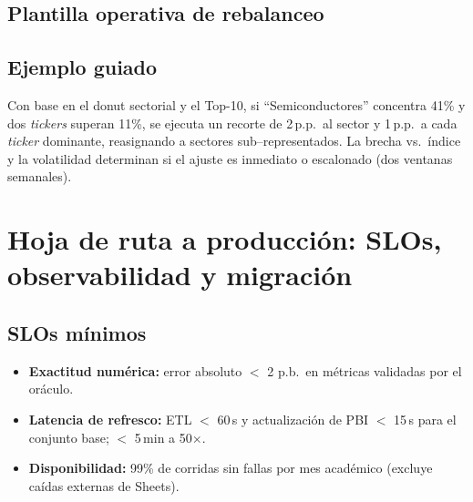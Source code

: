 \documentclass[conference]{IEEEtran}
\begin{document}
\subsection{Plantilla operativa de rebalanceo}
\begin{table}[!t]
\centering
\caption{Plantilla de política de rebalanceo (parametrizable)}
\label{tab:politica}
\vspace{-2mm}
\end{table}

\subsection{Ejemplo guiado}
Con base en el donut sectorial y el Top-10, si “Semiconductores” concentra 41\% y dos \emph{tickers} superan 11\%, se ejecuta un recorte de 2\,p.p.\ al sector y 1\,p.p.\ a cada \emph{ticker} dominante, reasignando a sectores sub–representados. La brecha vs.\ índice y la volatilidad determinan si el ajuste es inmediato o escalonado (dos ventanas semanales).

\section{Hoja de ruta a producción: SLOs, observabilidad y migración}
\subsection{SLOs mínimos}
\begin{itemize}
    \item \textbf{Exactitud numérica:} error absoluto $<$ 2 p.b.\ en métricas validadas por el oráculo.
    \item \textbf{Latencia de refresco:} ETL $<$ 60\,s y actualización de PBI $<$ 15\,s para el conjunto base; $<$ 5\,min a 50$\times$.
    \item \textbf{Disponibilidad:} 99\% de corridas sin fallas por mes académico (excluye caídas externas de Sheets).
\end{itemize}
\end{document}
